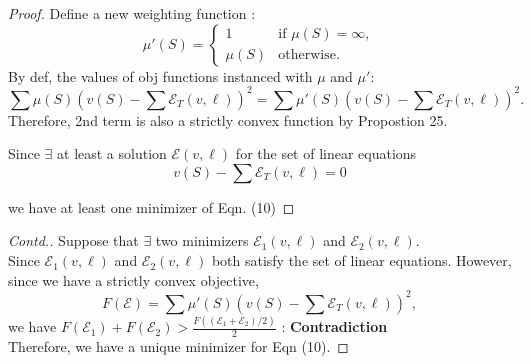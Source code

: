 \documentclass[10pt]{beamer}
\newcommand{\f}{v}
\newcommand{\ex}{\Expl}
\def\Expl{\mathcal{E}}
\begin{document}
\begin{frame}
    \begin{proof}
    
    Define a new weighting function :
    \[
    \mu'(S) = 
    \begin{cases} 
    1 & \text{if } \mu(S) = \infty, \\
    \mu(S) & \text{otherwise.}
    \end{cases}
    \]
    By def, the values of obj functions instanced with $\mu$ and $\mu'$:
    $$
    \sum  \mu(S) \left( \f(S) - \sum \Expl_T(\f,\ell) \right)^2
    = \sum  \mu'(S) \left( \f(S) - \sum\Expl_T(\f,\ell) \right)^2.
    $$
    Therefore, 2nd term is also a strictly convex function by Propostion 25.
    
    Since $\exists$ at least a solution $\ex(\f,\ell)$ for the set of linear equations \\
    $$\f(S) - \sum\Expl_T(\f,\ell) =0$$
    
    we have at least one minimizer of Eqn. (10)
    \renewcommand{\qedsymbol}{} %
    \end{proof}

\end{frame}
\begin{frame}
    \begin{proof}[Contd.]
        \vspace{0.3cm}
        Suppose that $\exists$ two minimizers $\ex_1(\f,\ell)$ and $\ex_2(\f,\ell)$. \\
        Since $\ex_1(\f,\ell)$ and $\ex_2(\f,\ell)$ both satisfy the set of linear equations. However, since we have a strictly convex objective,
        $$
        F(\ex) = \sum  \mu'(S) \left( \f(S) - \sum\Expl_T(\f,\ell) \right)^2,
        $$
        we have $F(\ex_1) + F(\ex_2) > \frac{F((\ex_1+\ex_2)/2)}{2}$ : \textbf{Contradiction} \\
        Therefore, we have a unique minimizer for Eqn (10).
    \end{proof}
\end{frame}

\end{document}
